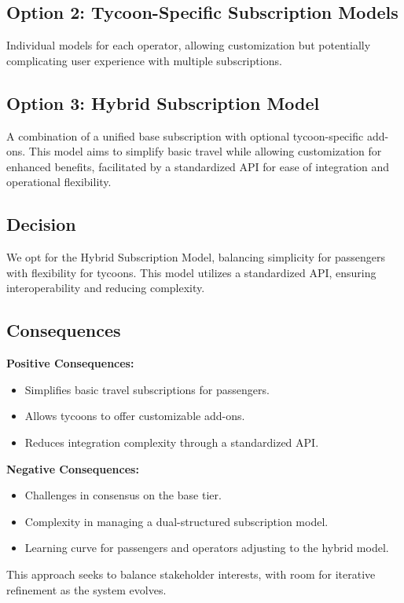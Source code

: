 \subsection*{Option 2: Tycoon-Specific Subscription Models}
Individual models for each operator, allowing customization but potentially complicating user experience with multiple subscriptions.

\subsection*{Option 3: Hybrid Subscription Model}
A combination of a unified base subscription with optional tycoon-specific add-ons. This model aims to simplify basic travel while allowing customization for enhanced benefits, facilitated by a standardized API for ease of integration and operational flexibility.

\subsection*{Decision}
We opt for the Hybrid Subscription Model, balancing simplicity for passengers with flexibility for tycoons. This model utilizes a standardized API, ensuring interoperability and reducing complexity.

\subsection*{Consequences}
\textbf{Positive Consequences:}
\begin{itemize}
\item Simplifies basic travel subscriptions for passengers.
\item Allows tycoons to offer customizable add-ons.
\item Reduces integration complexity through a standardized API.
\end{itemize}
\textbf{Negative Consequences:}
\begin{itemize}
\item Challenges in consensus on the base tier.
\item Complexity in managing a dual-structured subscription model.
\item Learning curve for passengers and operators adjusting to the hybrid model.
\end{itemize}
This approach seeks to balance stakeholder interests, with room for iterative refinement as the system evolves.
